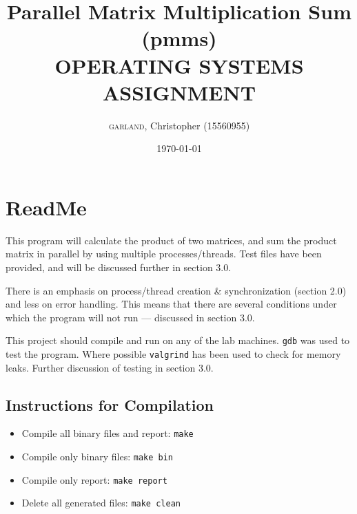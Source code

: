 \documentclass[titlepage]{article}
\title{Parallel Matrix Multiplication Sum (pmms)\\ OPERATING SYSTEMS ASSIGNMENT}
\author{\textsc{garland,} Christopher (15560955)} %
\date{\today} %
\begin{document}
\maketitle %


\section{ReadMe}

This program will calculate the product of two matrices, and sum the product 
matrix in parallel by using multiple processes/threads. Test files have been 
provided, and will be discussed further in section 3.0.
\par
There is an emphasis on process/thread creation \& synchronization (section 2.0)
and less on  error handling. This means that there are several conditions 
under which the program will not run --- discussed in section 3.0.
\par
This project should compile and run on any of the lab machines. 
\texttt{gdb} was used to test the program. Where possible \texttt{valgrind} 
has been used to check for memory leaks. Further discussion of testing in 
section 3.0.

\subsection{Instructions for Compilation}
\begin{itemize}
	\item Compile all binary files and report: \texttt{make}
    \item Compile only binary files: \hspace{37pt} \texttt{make bin}
    \item Compile only report: \hspace{58pt} \texttt{make report}
    \item Delete all generated files: \hspace{39pt} \texttt{make clean}
\end{itemize}
\end{document}
